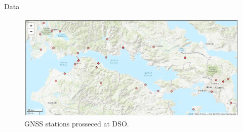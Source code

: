 \documentclass[final,a0,portrait]{beamer}
\newlength{\onecolwid}
\begin{document}
\begin{frame}[t]
\begin{columns}[t]
\begin{column}{\onecolwid}
\begin{block}{Data}
{%
}
\begin{figure}
  \centering
  \includegraphics[width=1\onecolwid]{gsg2022_sta.png}
  \caption{GNSS stations prosseced at DSO.}
  \label{fig:sta}
\end{figure}
\end{block}





\end{column}
\end{columns}
\end{frame}
\end{document}
